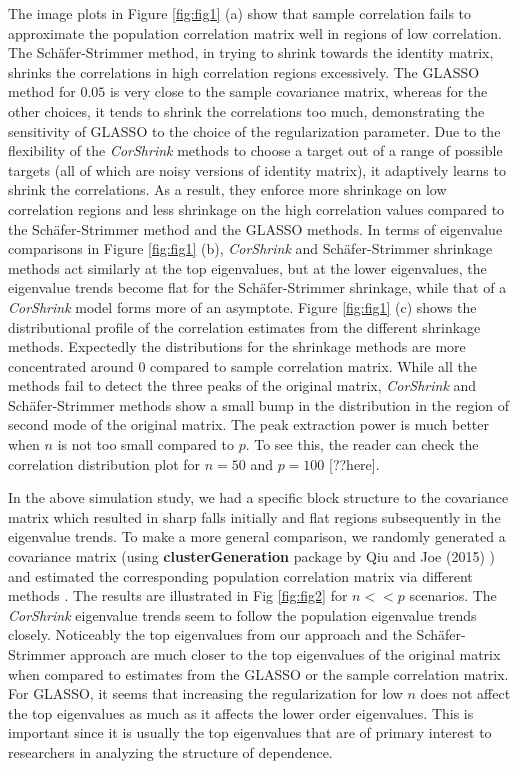 The image plots in Figure \ref{fig:fig1} (a) show that sample correlation fails to approximate the population correlation matrix well in regions of low correlation. The Sch\"{a}fer-Strimmer method, in trying to shrink towards the identity matrix, shrinks the correlations in high correlation regions excessively. The GLASSO method for $0.05$ is very close to the sample covariance matrix, whereas for the other choices, it tends to shrink the correlations too much, demonstrating the sensitivity of GLASSO to the choice of the regularization parameter. Due to the flexibility of the \textit{CorShrink} methods to choose a  target out of a range of possible targets (all of which are noisy versions of identity matrix), it adaptively learns to shrink the correlations. As a result, they enforce more shrinkage on low correlation regions and less shrinkage on the high correlation values compared to the Sch\"{a}fer-Strimmer method and the GLASSO methods. In terms of eigenvalue comparisons in Figure \ref{fig:fig1} (b), \textit{CorShrink} and Sch\"{a}fer-Strimmer shrinkage methods act similarly at the top eigenvalues, but at the lower eigenvalues, the eigenvalue trends become flat for the Sch\"{a}fer-Strimmer shrinkage, while that of a \textit{CorShrink} model forms more of an asymptote. Figure \ref{fig:fig1} (c) shows the distributional profile of the correlation estimates from the different  shrinkage methods. Expectedly the distributions for the shrinkage methods are more concentrated around $0$ compared to sample correlation matrix. While all the methods fail to detect the three peaks of the original matrix, \textit{CorShrink} and Sch\"{a}fer-Strimmer methods show a small bump in the distribution in the region of second mode of the original matrix. The peak extraction power is much better when $n$ is not too small compared to $p$. To see this, the reader can check the correlation distribution plot for $n=50$ and $p=100$ [??here]. 

In the above simulation study, we had a specific block structure to the covariance matrix which resulted in sharp falls initially and flat regions subsequently in the eigenvalue trends. To make a more general comparison, we randomly generated a covariance matrix (using \textbf{clusterGeneration} package by Qiu and Joe (2015) \cite{Qiu2015}) and estimated the corresponding population correlation matrix via different methods . The results are illustrated in Fig \ref{fig:fig2} for $n << p$ scenarios. The \textit{CorShrink} eigenvalue trends seem to follow the population eigenvalue trends closely. Noticeably the top eigenvalues from our approach and the Sch\"{a}fer-Strimmer approach are much closer to the top eigenvalues of the original matrix when compared to estimates from the GLASSO  or the sample correlation matrix. For GLASSO, it seems that increasing the regularization for low $n$ does not affect the top eigenvalues as much as it affects the lower order eigenvalues. This is important since it is usually the top eigenvalues that are of primary interest to researchers in analyzing the structure of dependence.

